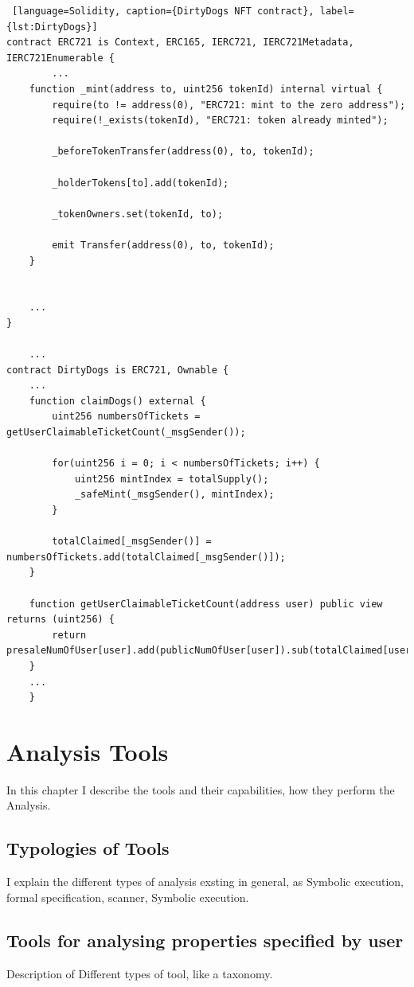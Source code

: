     
\begin{lstlisting} [language=Solidity, caption={DirtyDogs NFT contract}, label={lst:DirtyDogs}]
contract ERC721 is Context, ERC165, IERC721, IERC721Metadata, IERC721Enumerable {
        ... 
    function _mint(address to, uint256 tokenId) internal virtual {
        require(to != address(0), "ERC721: mint to the zero address");
        require(!_exists(tokenId), "ERC721: token already minted");

        _beforeTokenTransfer(address(0), to, tokenId);

        _holderTokens[to].add(tokenId);

        _tokenOwners.set(tokenId, to);

        emit Transfer(address(0), to, tokenId);
    }


    ...
}
    
    ... 
contract DirtyDogs is ERC721, Ownable {
    ...
    function claimDogs() external {
        uint256 numbersOfTickets = getUserClaimableTicketCount(_msgSender());
        
        for(uint256 i = 0; i < numbersOfTickets; i++) {
            uint256 mintIndex = totalSupply();
            _safeMint(_msgSender(), mintIndex);
        }

        totalClaimed[_msgSender()] = numbersOfTickets.add(totalClaimed[_msgSender()]);
    }

    function getUserClaimableTicketCount(address user) public view returns (uint256) {
        return presaleNumOfUser[user].add(publicNumOfUser[user]).sub(totalClaimed[user]);
    }
    ...
    }
\end{lstlisting} 

\chapter{Analysis Tools}
\label{ch:Tools}
In this chapter I describe the tools and their capabilities, how they perform the Analysis.

\section{Typologies of Tools}
\label{sec:Tools:Typologies}
I explain the different types of analysis exsting in general, as Symbolic execution, formal specification, scanner, Symbolic execution.

\section{Tools for analysing properties specified by user}
\label{sec:Tools:Specification}
Description of Different types of tool, like a taxonomy.

